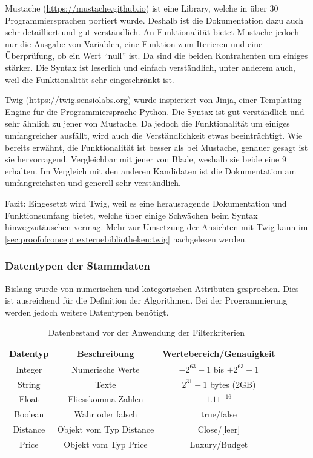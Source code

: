 Mustache (\url{https://mustache.github.io}) ist eine Library, welche in über 30 Programmiersprachen portiert wurde. Deshalb ist die Dokumentation dazu auch sehr detailliert und gut verständlich. An Funktionalität bietet Mustache jedoch nur die Ausgabe von Variablen, eine Funktion zum Iterieren und eine Überprüfung, ob ein Wert "`null"' ist. Da sind die beiden Kontrahenten um einiges stärker. Die Syntax ist leserlich und einfach verständlich, unter anderem auch, weil die Funktionalität sehr eingeschränkt ist.

Twig (\url{https://twig.sensiolabs.org}) wurde inspieriert von Jinja, einer Templating Engine für die Programmiersprache Python. Die Syntax ist gut verständlich und sehr ähnlich zu jener von Mustache. Da jedoch die Funktionalität um einiges umfangreicher ausfällt, wird auch die Verständlichkeit etwas beeinträchtigt. Wie bereits erwähnt, die Funktionalität ist besser als bei Mustache, genauer gesagt ist sie hervorragend. Vergleichbar mit jener von Blade, weshalb sie beide eine 9 erhalten. Im Vergleich mit den anderen Kandidaten ist die Dokumentation am umfangreichsten und generell sehr verständlich.

Fazit: Eingesetzt wird Twig, weil es eine herausragende Dokumentation und Funktionsumfang bietet, welche über einige Schwächen beim Syntax hinwegzutäuschen vermag. Mehr zur Umsetzung der Ansichten mit Twig kann im \cref{sec:proofofconcept:externebibliotheken:twig} nachgelesen werden.

\subsubsection{Datentypen der Stammdaten}
\label{sec:proofofconcept:architektur:anforderungen:datentypen}
Bislang wurde von numerischen und kategorischen Attributen gesprochen. Dies ist ausreichend für die Definition der Algorithmen. Bei der Programmierung werden jedoch weitere Datentypen benötigt.

\begin{table}[H] 
	\caption{Datenbestand vor der Anwendung der Filterkriterien}
	\centering
	\label{fig:proofofconcept:architektur:anforderungen:datetypen:1}
	\begin{tabular}{ | c | c | c | c | } 
		\hline 		
		\rowcolor{tableheadcolor}
		\bfseries Datentyp & Beschreibung & Wertebereich/Genauigkeit  \\ \hline 
		
		Integer & Numerische Werte & $-2^{63}-1$ bis $+2^{63}-1$ \\ \hline 
		String & Texte & $2^{31}-1$ bytes (2GB) \\ \hline 
		Float & Fliesskomma Zahlen & $1.11^{-16}$ \\ \hline 
		Boolean & Wahr oder falsch & true/false \\ \hline  
		Distance & Objekt vom Typ Distance & Close/[leer] \\ \hline 
		Price & Objekt vom Typ Price & Luxury/Budget \\ \hline 		
	\end{tabular}
\end{table}

